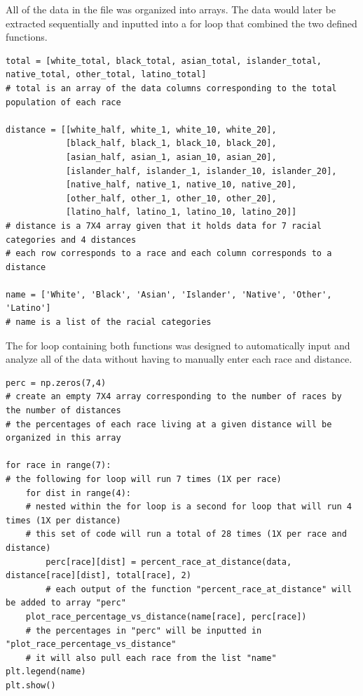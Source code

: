 \documentclass[letterpaper]{article} %
\begin{document}
All of the data in the file was organized into arrays. The data would later be extracted sequentially and inputted into a for loop that combined the two defined functions.
\vspace{0.25cm}

\lstset{language=Python}
\begin{lstlisting}[frame=single]
total = [white_total, black_total, asian_total, islander_total, native_total, other_total, latino_total]
# total is an array of the data columns corresponding to the total population of each race

distance = [[white_half, white_1, white_10, white_20],
            [black_half, black_1, black_10, black_20],
            [asian_half, asian_1, asian_10, asian_20],
            [islander_half, islander_1, islander_10, islander_20],
            [native_half, native_1, native_10, native_20],
            [other_half, other_1, other_10, other_20],
            [latino_half, latino_1, latino_10, latino_20]]
# distance is a 7X4 array given that it holds data for 7 racial categories and 4 distances
# each row corresponds to a race and each column corresponds to a distance

name = ['White', 'Black', 'Asian', 'Islander', 'Native', 'Other', 'Latino']
# name is a list of the racial categories
\end{lstlisting}

The for loop containing both functions was designed to automatically input and analyze all of the data without having to manually enter each race and distance.  
\vspace{0.25cm}

\lstset{language=Python}
\begin{lstlisting}[frame=single]
perc = np.zeros(7,4)
# create an empty 7X4 array corresponding to the number of races by the number of distances
# the percentages of each race living at a given distance will be organized in this array

for race in range(7):
# the following for loop will run 7 times (1X per race)
    for dist in range(4):
    # nested within the for loop is a second for loop that will run 4 times (1X per distance)
    # this set of code will run a total of 28 times (1X per race and distance)
        perc[race][dist] = percent_race_at_distance(data, distance[race][dist], total[race], 2)
        # each output of the function "percent_race_at_distance" will be added to array "perc"
    plot_race_percentage_vs_distance(name[race], perc[race])
    # the percentages in "perc" will be inputted in "plot_race_percentage_vs_distance"
    # it will also pull each race from the list "name"
plt.legend(name)
plt.show()
\end{lstlisting}
\end{document}
